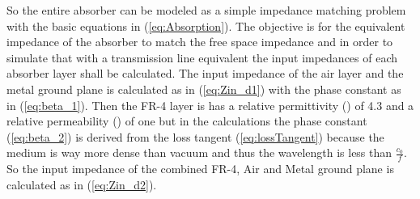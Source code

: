             So the entire absorber can be modeled as a simple impedance matching
            problem with the basic equations in (\ref{eq:Absorption}). The
            objective is for the equivalent impedance of the absorber to match
            the free space impedance and in order to simulate that with a 
            transmission line equivalent the input impedances of each absorber
            layer shall be calculated. The input impedance of the air layer and
            the metal ground plane is calculated as in (\ref{eq:Zin_d1}) with
            the phase constant as in (\ref{eq:beta_1}). Then the FR-4 layer
            is has a relative permittivity (\epsilon) of 4.3 and a relative 
            permeability (\mu) of one but in the calculations the phase
            constant (\ref{eq:beta_2}) is derived from the loss tangent 
            (\ref{eq:lossTangent}) because the medium is way more dense than
            vacuum and thus the wavelength is less than $\frac{c_0}{f}$. So the 
            input impedance of the combined FR-4, Air and Metal ground plane is 
            calculated as in (\ref{eq:Zin_d2}).


